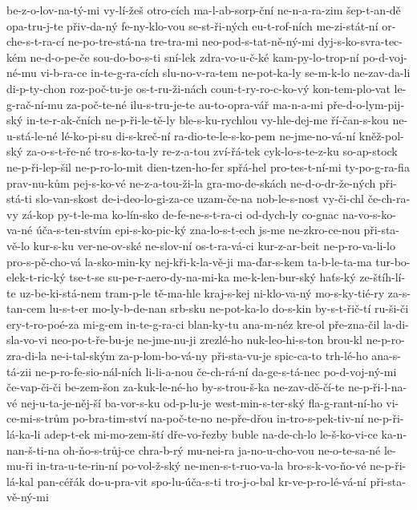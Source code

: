 {be-z-o-lov-na-tý-mi
vy-lí-žeš
otro-cích
ma-l-ab-sorp-ční
ne-n-a-ra-zim
šep-t-an-dě
opa-tru-j-te
přiv-da-ný
fe-ny-klo-vou
se-st-ři-ných
eu-t-rof-ních
me-zi-stát-ní
or-che-s-t-ra-cí
ne-po-tre-stá-na
tre-tra-mi
neo-pod-s-tat-ně-ný-mi
dyj-s-ko-svra-tec-kém
ne-d-o-pe-če
sou-do-bo-s-ti
sní-lek
zdra-vo-u-č-ké
kam-py-lo-trop-ní
po-d-voj-né-mu
vi-b-ra-ce
in-te-g-ra-cích
slu-no-v-ra-tem
ne-pot-ka-ly
se-m-k-lo
ne-zav-da-li
di-p-ty-chon
roz-poč-tu-je
os-t-ru-ži-nách
coun-t-ry-ro-c-ko-vý
kon-tem-plo-vat
le-g-rač-ní-mu
za-poč-te-né
ilu-s-tru-je-te
au-to-opra-vář
ma-n-a-mi
pře-d-o-lym-pij-ský
in-te-r-ak-čních
ne-p-ři-le-tě-ly
ble-s-ku-rychlou
vy-hle-dej-me
ří-čan-s-kou
ne-u-stá-le-né
lé-ko-pi-su
di-s-kreč-ní
ra-dio-te-le-s-ko-pem
ne-jme-no-vá-ní
kněž-pol-ský
za-o-s-t-ře-né
tro-s-ko-ta-ly
re-z-a-tou
zví-řá-tek
cyk-lo-s-te-z-ku
so-ap-stock
ne-p-ři-lep-šil
ne-p-ro-lo-mit
dien-tzen-ho-fer
spřá-hel
pro-tes-t-ní-mi
ty-po-g-ra-fia
prav-nu-kům
pej-s-ko-vé
ne-z-a-tou-ži-la
gra-mo-de-skách
ne-d-o-dr-že-ných
při-stá-ti
slo-van-skost
de-i-deo-lo-gi-za-ce
uzam-če-na
nob-le-s-nost
vy-či-chl
če-ch-ra-vy
zá-kop
py-t-le-ma
ko-lín-sko
de-fe-ne-s-t-ra-ci
od-dych-ly
co-gnac
na-vo-s-ko-va-né
úča-s-ten-stvím
epi-s-ko-pic-ký
zna-lo-s-t-ech
js-me
ne-zkro-ce-nou
při-sta-vě-lo
kur-s-ku
ver-ne-ov-ské
ne-slov-ní
os-t-ra-vá-ci
kur-z-ar-beit
ne-p-ro-va-li-lo
pro-s-pě-cho-vá
la-sko-min-ky
nej-kři-k-la-vě-ji
ma-ďar-s-kem
ta-b-le-ta-ma
tur-bo-elek-t-ric-ký
tse-t-se
su-pe-r-aero-dy-na-mi-ka
me-k-len-bur-ský
haťs-ký
ze-štíh-lí-te
uz-be-ki-stá-nem
tram-p-le
tě-ma-hle
kraj-s-kej
ni-klo-va-ný
mo-s-ky-tié-ry
za-s-tan-cem
lu-s-t-er
mo-ly-b-de-nan
srb-sku
ne-pot-ka-lo
do-s-kin
by-s-t-řič-tí
ru-ši-či
ery-t-ro-poé-za
mi-g-em
in-te-g-ra-ci
blan-ky-tu
ana-m-néz
kre-ol
pře-zna-čil
la-di-sla-vo-vi
neo-po-t-ře-bu-je
ne-jme-nu-ji
zrezlé-ho
nuk-leo-hi-s-ton
brou-kl
ne-p-ro-zra-di-la
ne-i-tal-ským
za-p-lom-bo-vá-ny
při-sta-vu-je
spic-ca-to
trh-lé-ho
ana-s-tá-zii
ne-p-ro-fe-sio-nál-ních
li-li-a-nou
če-ch-rá-ní
da-ge-s-tá-nec
po-d-voj-ný-mi
če-vap-či-či
be-zem-šon
za-kuk-le-né-ho
by-s-trou-š-ka
ne-zav-dě-čí-te
ne-p-ři-l-na-vé
nej-u-ta-je-něj-ší
ba-vor-s-ku
od-p-lu-je
west-min-s-ter-ský
fla-g-rant-ní-ho
vi-ce-mi-s-trům
po-bra-tim-ství
na-poč-te-no
ne-pře-dřou
in-tro-s-pek-tiv-ní
ne-p-ři-lá-ka-li
adep-t-ek
mi-mo-zem-ští
dře-vo-řezby
buble
na-de-ch-lo
le-š-ko-vi-ce
ka-n-nan-š-ti-na
oh-ňo-s-trůj-ce
chra-b-rý
mu-nei-ra
ja-no-u-cho-vou
ne-o-te-sa-né
le-mu-ři
in-tra-u-te-rin-ní
po-vol-ž-ský
ne-men-s-t-ruo-va-la
bro-s-k-vo-ňo-vé
ne-p-ři-lá-kal
pan-céřák
do-u-pra-vit
spo-lu-úča-s-ti
tro-j-o-bal
kr-ve-p-ro-lé-vá-ní
při-sta-vě-ný-mi
}

